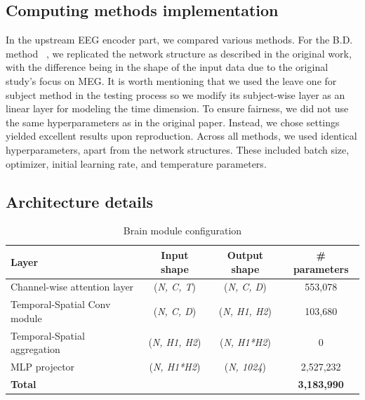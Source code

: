\documentclass{article}
\begin{document}
\subsection{Computing methods implementation}

In the upstream EEG encoder part, we compared various methods. For the B.D. method ~\cite{Benchetrit_2023}, we replicated the network structure as described in the original work, with the difference being in the shape of the input data due to the original study's focus on MEG. It is worth mentioning that we used the leave one for subject method in the testing process so we modify its subject-wise layer as an linear layer for modeling the time dimension. To ensure fairness, we did not use the same hyperparameters as in the original paper. Instead, we chose settings yielded excellent results upon reproduction. Across all methods, we used identical hyperparameters, apart from the network structures. These included batch size, optimizer, initial learning rate, and temperature parameters.



\subsection{Architecture details}
\begin{table}[h]
\centering
\caption{Brain module configuration}
\label{tab:brain_module}
\begin{tabular}{lccc}
\toprule
\textbf{Layer} & \textbf{Input shape} & \textbf{Output shape} & \textbf{\# parameters} \\
\midrule

Channel-wise attention layer & (\textit{N, C, T}) & (\textit{N, C, D}) & 553,078 \\
Temporal-Spatial Conv module & (\textit{N, C, D}) & (\textit{N, H1, H2}) & 103,680 \\
Temporal-Spatial aggregation & (\textit{N, H1, H2}) & (\textit{N, H1*H2}) & 0 \\
MLP projector & (\textit{N, H1*H2}) & (\textit{N, 1024}) & 2,527,232 \\
\midrule
\textbf{Total} & & & \textbf{3,183,990} \\
\bottomrule
\end{tabular}
\end{table}
\end{document}
